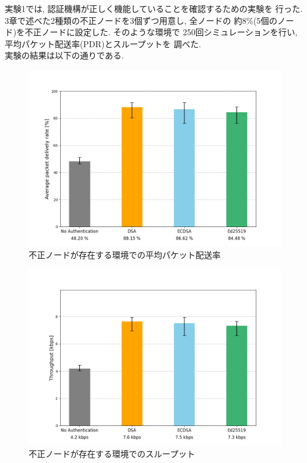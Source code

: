 実験1では, 認証機構が正しく機能していることを確認するための実験を
行った. 3章で述べた2種類の不正ノードを3個ずつ用意し, 全ノードの
約8\%(5個のノード)を不正ノードに設定した. そのような環境で
250回シミュレーションを行い, 平均パケット配送率(PDR)とスループットを
調べた. \\
\indent 実験の結果は以下の通りである. \\

\begin{figure}
  \centering
  \includegraphics[width=1\textwidth]{figures/exp1_pdr.png}
  \caption{不正ノードが存在する環境での平均パケット配送率}
  \label{fig:exp1_pdr}
\end{figure}

\begin{figure}
  \centering
  \includegraphics[width=1\textwidth]{figures/exp1_throughput.png}
  \caption{不正ノードが存在する環境でのスループット}
  \label{fig:exp1_throughput}
\end{figure}


